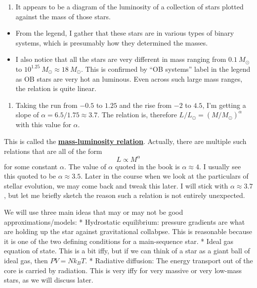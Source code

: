 \documentclass[11pt]{article}
\providecommand{\tightlist}{%
      \setlength{\itemsep}{0pt}\setlength{\parskip}{0pt}}
\begin{document}
\begin{enumerate}
\def\labelenumi{\alph{enumi}.}
\tightlist
\item
  It appears to be a diagram of the luminosity of a collection of stars
  plotted against the mass of those stars.
\end{enumerate}

\begin{itemize}
\tightlist
\item
  From the legend, I gather that these stars are in various types of
  binary systems, which is presumably how they determined the masses.
\item
  I also notice that all the stars are very different in mass ranging
  from \(0.1\ M_\odot\) to \(10^{1.25}\ M_\odot \approx 18\ M_\odot\).
  This is confirmed by ``OB systems'' label in the legend as OB stars
  are very hot an luminous. Even across such large mass ranges, the
  relation is quite linear.
\end{itemize}

\begin{enumerate}
\def\labelenumi{\alph{enumi}.}
\setcounter{enumi}{1}
\tightlist
\item
  Taking the run from \(-0.5\) to \(1.25\) and the rise from \(-2\) to
  \(4.5\), I'm getting a slope of \(\alpha=6.5/1.75\approx 3.7\). The
  relation is, therefore \(L/L_\odot = \left( M/M_\odot\right)^\alpha\)
  with this value for \(\alpha\).
\end{enumerate}


    This is called the
\href{https://en.wikipedia.org/wiki/Mass\%E2\%80\%93luminosity_relation}{\textbf{mass-luminosity
relation}}. Actually, there are multiple such relations that are all of
the form \[
L \propto M^\alpha \tag{8}
\] for some constant \(\alpha\). The value of \(\alpha\) quoted in the
book is \(\alpha\approx 4\). I usually see this quoted to be
\(\alpha\approx 3.5\). Later in the course when we look at the
particulars of stellar evolution, we may come back and tweak this later.
I will stick with \(\alpha \approx 3.7\), but let me briefly sketch the
reason such a relation is not entirely unexpected.

We will use three main ideas that may or may not be good
approximations/models: * Hydrostatic equilibrium: pressure gradients are
what are holding up the star against gravitational collabpse. This is
reasonable because it is one of the two defining conditions for a
main-sequence star. * Ideal gas equation of state. This is a bit iffy,
but if we can think of a star as a giant ball of ideal gas, then
\(PV=Nk_BT\). * Radiative diffusion: The energy transport out of the
core is carried by radiation. This is very iffy for very massive or very
low-mass stars, as we will discuss later.
\end{document}
